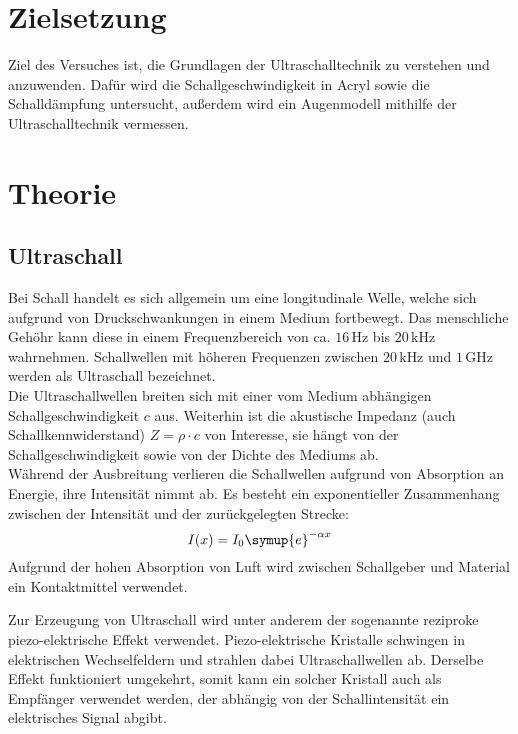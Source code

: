 \section{Zielsetzung}
Ziel des Versuches ist, die Grundlagen der Ultraschalltechnik zu verstehen und anzuwenden.
Dafür wird die Schallgeschwindigkeit in Acryl sowie die Schalldämpfung untersucht, außerdem
wird ein Augenmodell mithilfe der Ultraschalltechnik vermessen.

\section{Theorie}
\label{sec:Theorie}

\subsection{Ultraschall}
\label{sec:Ultraschall}

Bei Schall handelt es sich allgemein um eine longitudinale Welle, welche sich aufgrund von Druckschwankungen
in einem Medium fortbewegt.
Das menschliche Gehöhr kann diese in einem Frequenzbereich von ca. $16\,\unit{\hertz}$ bis $20\,\unit{\kilo\hertz}$
wahrnehmen. Schallwellen mit höheren Frequenzen zwischen $20\,\unit{\kilo\hertz}$ und $1\,\unit{\giga\hertz}$ werden als
Ultraschall bezeichnet. \\
Die Ultraschallwellen breiten sich mit einer vom Medium abhängigen Schallgeschwindigkeit $c$ aus.
Weiterhin ist die akustische Impedanz (auch Schallkennwiderstand) $Z=\rho \cdot c$ von Interesse, sie hängt
von der Schallgeschwindigkeit sowie von der Dichte des Mediums ab. \\
Während der Ausbreitung verlieren die Schallwellen aufgrund von Absorption an Energie, ihre Intensität nimmt ab.
Es besteht ein exponentieller Zusammenhang zwischen der Intensität und der zurückgelegten Strecke:
\begin{equation}
    \label{eq:Dämpfung}
    I(x)=I_{0}\symup{e}^{-\alpha x}
\end{equation}
Aufgrund der hohen Absorption von Luft wird zwischen Schallgeber und Material ein Kontaktmittel verwendet.

Zur Erzeugung von Ultraschall wird unter anderem der sogenannte reziproke piezo-elektrische Effekt verwendet.
Piezo-elektrische Kristalle schwingen in elektrischen Wechselfeldern und strahlen dabei Ultraschallwellen ab.
Derselbe Effekt funktioniert umgekehrt, somit kann ein solcher Kristall auch als Empfänger verwendet werden,
der abhängig von der Schallintensität ein elektrisches Signal abgibt.

